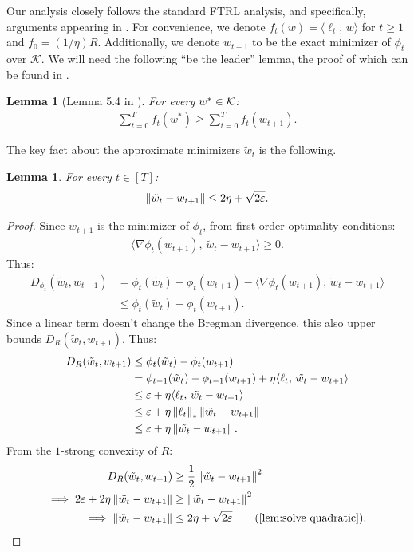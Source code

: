 \documentclass[10pt]{article}
\newtheorem{lemma}[theorem]{Lemma}
\theoremstyle{definition}
\theoremstyle{remark}
\renewcommand{\epsilon}{\varepsilon}
\newcommand\inprod[2]{\langle #1,\,#2 \rangle}
\begin{document}
Our analysis closely follows the standard FTRL analysis, and specifically, arguments appearing in \citet{hazan2016introduction}. 
For convenience, we denote $f_t(w) = \inprod{\ell_t}{w}$ for $t\ge 1$ and $f_0 = (1/\eta) R$. Additionally, we denote $w_{t+1}$ to be the exact minimizer of $\phi_{t}$ over $\mathcal{K}$. We will need the following ``be the leader'' lemma, the proof of which can be found in \citet{hazan2016introduction}.

\begin{lemma}[Lemma 5.4 in \citealp{hazan2016introduction}]\label{lem:ftl}
For every $w^*\in\mathcal K$:
\begin{align*}
    \sum_{t=0}^T f_t(w^*) \ge \sum_{t=0}^T f_t(w_{t+1})
    .
\end{align*}
\end{lemma}
% 
The key fact about the approximate minimizers $\tilde w_t$ is the following.
% 
\begin{lemma}\label{lem:ftrl_movement}
For every $t\in[T]$:
\begin{align*}
    \norm{\tilde{w}_t - w_{t+1}} \le 2\eta + \sqrt{2\epsilon}
    .
\end{align*}
\end{lemma}
\begin{proof}
Since $w_{t+1}$ is the minimizer of $\phi_t$, from first order optimality conditions:
\begin{align*}
    \inprod{\nabla\phi_t(w_{t+1})}{\tilde{w}_t - w_{t+1}} \ge 0
    .
\end{align*}
% 
Thus:
\begin{align*}
    D_{\phi_t}(\tilde{w}_t, w_{t+1}) &= \phi_t(\tilde{w}_t) - \phi_t(w_{t+1}) - \inprod{\nabla \phi_t(w_{t+1})}{\tilde{w}_t - w_{t+1}} \\
    &\le \phi_t(\tilde{w}_t) - \phi_t(w_{t+1})
    .
\end{align*}
% 
Since a linear term doesn't change the Bregman divergence, this also upper bounds $D_R(\tilde{w}_t, w_{t+1})$. Thus:
\begin{align*}
    D_R(\tilde{w}_t, w_{t+1}) &\le \phi_t(\tilde{w}_t) - \phi_t(w_{t+1})\\
    &= \phi_{t-1}(\tilde{w}_t) - \phi_{t-1}(w_{t+1}) + \eta \inprod{\ell_t}{\tilde{w_t} - w_{t+1}}\\
    &\le \epsilon + \eta \inprod{\ell_t}{\tilde{w_t} - w_{t+1}}\\
    &\le \epsilon + \eta \norm{\ell_t}_*\norm{\tilde{w_t} - w_{t+1}}\\
    &\le \epsilon + \eta \norm{\tilde{w_t} - w_{t+1}}
    .
\end{align*}
% 
From the $1$-strong convexity of $R$:
\begin{align*}
    D_R(\tilde{w}_t, w_{t+1}) &\ge \frac{1}{2}\norm{\tilde{w}_t - w_{t+1}}^2\\
    \implies 2\epsilon + 2\eta \norm{\tilde{w_t} - w_{t+1}} &\ge\norm{\tilde{w}_t - w_{t+1}}^2 \\
    \implies \norm{\tilde{w}_t - w_{t+1}} &\le 2\eta + \sqrt{2\epsilon}\tag{\Cref{lem:solve quadratic}}
    .
\end{align*}
\end{proof}
\end{document}
